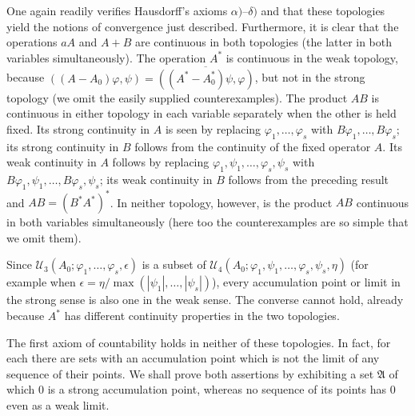 \documentclass[
  paper=b5,
  twoside=true,
  fontsize=13pt,
  headings=normal,
  bookmarkpackage=false
]{scrartcl}
\theoremstyle{definition}
\begin{document}
One again readily verifies Hausdorff's axioms $\alpha)$--$\delta)$ and that
these topologies yield the notions of convergence just described.
Furthermore, it is clear that the operations $aA$ and $A+B$ are continuous
in both topologies (the latter in both variables simultaneously). The
operation $A^*$ is continuous in the weak topology, because $((A-A_0)\varphi,\psi) = \overline{((A^*-A_0^*)\psi,\varphi)}$,
but not in the strong topology (we omit the easily supplied
counterexamples). The product $AB$ is continuous in either topology in
each variable separately when the other is held fixed. Its strong
continuity in $A$ is seen by replacing $\varphi_1,\ldots,\varphi_s$ with $B\varphi_1,\ldots,B\varphi_s$; its strong continuity in $B$ follows from
the continuity of the fixed operator $A$. Its weak continuity in $A$
follows by replacing $\varphi_1,\psi_1,\ldots,\varphi_s,\psi_s$
with $B\varphi_1,\psi_1,\ldots,B\varphi_s,\psi_s$;
its weak continuity in $B$ follows from the preceding result and $AB=(B^*A^*)^*$.
In neither topology, however, is the product $AB$ continuous in both
variables simultaneously (here too the counterexamples are so simple that
we omit them).

Since $\mathcal U_3(A_0;\varphi_1,\ldots,\varphi_s,\epsilon)$ is a subset of $\mathcal U_4(A_0;\varphi_1,\psi_1,\ldots,\varphi_s,\psi_s,\eta)$ (for example
when $\epsilon=\eta/\max(|\psi_1|,\ldots,|\psi_s|)$), every accumulation
point or limit in the strong sense is also one in the
weak sense. The converse cannot hold, already because $A^*$ has different
continuity properties in the two topologies.

The first axiom of countability holds in neither of these topologies. In
fact, for each there are sets with an accumulation point which is not the
limit of any sequence of their points. We shall prove both assertions by
exhibiting a set $\mathfrak A$ of which $0$ is a strong accumulation point,
whereas no sequence of its points has $0$ even as a weak limit.
\end{document}
